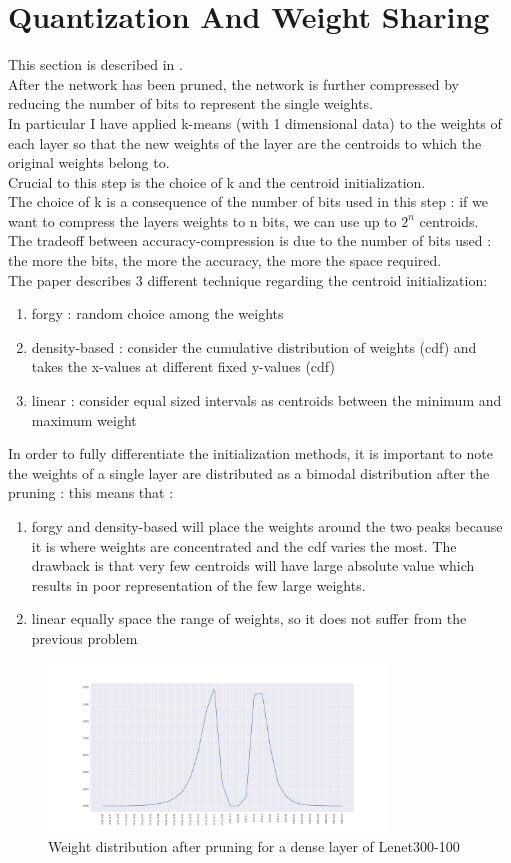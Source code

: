 \documentclass[journal]{vgtc}                %
\begin{document}
\section{Quantization And Weight Sharing}
This section is described in \cite{p2}.\\After the network has been pruned, the network is further compressed by reducing the number of bits to represent the single weights.\\In particular I have applied k-means (with 1 dimensional data) to the weights of each layer so that the new weights of the layer are the centroids to which the original weights belong to.\\Crucial to this step is the choice of k and the centroid initialization.\\The choice of k is a consequence of the number of bits used in this step : if we want to compress the layers weights to n bits, we can use up to $2^{n}$ centroids.\\The tradeoff between accuracy-compression is due to the number of bits used : the more the bits, the more the accuracy, the more the space required.\\The paper describes 3 different technique regarding the centroid initialization:
\begin{enumerate}
\item forgy : random choice among the weights 
\item density-based : consider the cumulative distribution of weights (cdf) and takes the x-values at different fixed y-values (cdf)
\item linear : consider equal sized intervals as centroids between the minimum and maximum weight
\end{enumerate}
In order to fully differentiate the initialization methods, it is important to note  the weights of a single layer are distributed as a bimodal distribution after the pruning : this means that :
\begin{enumerate}
\item forgy and density-based will place the weights around the two peaks because it is where weights are concentrated and the cdf varies the most. The drawback is that very few centroids will have large absolute value which results in poor representation of the few large weights.
\item linear equally space the range of weights, so it does not suffer from the previous problem
\end{enumerate}
\begin{figure}[H]
	\includegraphics[width=90mm,scale=0.7]{weights-after-pruning}
	\caption{Weight distribution  after pruning for a dense layer of Lenet300-100 }
\end{figure}
\end{document}
